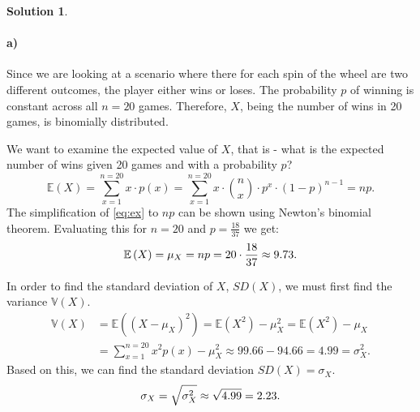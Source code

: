 \documentclass[a4paper]{article}
\theoremstyle{definition}
\newtheorem{sol}{Solution}
\begin{document}
\begin{sol}
\item\paragraph{a)} 
Since we are looking at a scenario where there for each spin of the wheel are
two different outcomes, the player either wins or loses. The probability $p$ of
winning is constant across all $n = 20$ games. Therefore, $X$, being the number
of wins in 20 games, is binomially distributed.

We want to examine the expected value of $X$, that is - what is the expected
number of wins given 20 games and with a probability $p$?
\begin{equation}
  \label{eq:ex}
  \mathbb{E}\left( X \right) = \sum_{x = 1}^{n = 20} x\cdot p(x) = \sum_{x =
  1}^{n = 20} x \cdot {n \choose x} \cdot p^{x} \cdot \left( 1-p \right)^{n-1}
  = np.
\end{equation}
The simplification of \eqref{eq:ex} to $np$ can be shown using Newton's binomial theorem.
Evaluating this for $n = 20$ and $p = \frac{18}{37}$ we get:
\begin{equation}
  \notag
  \mathbb{E}\left( X \right) = \mu_X = np = 20\cdot \frac{18}{37} \approx 9.73.
\end{equation}

In order to find the standard deviation of $X$, $SD(X)$, we must first find the variance $\mathbb{V}(X)$.
\begin{align*}
  \mathbb{V}(X) &= \mathbb{E}\left(\left(X-\mu_X\right)^{2}\right) = \mathbb{E}\left( X^{2} \right) - \mu_X^{2} = \mathbb{E}\left( X^{2} \right) - \mu_{X} \\
  &= \sum_{x=1}^{n=20} x^{2} p(x) - \mu_X^{2} \approx 99.66 - 94.66 = 4.99 = \sigma_{X}^{2}.
\end{align*}
Based on this, we can find the standard deviation $SD(X) = \sigma_{X}$.
\begin{equation}
  \notag
  \sigma_{X} = \sqrt{\sigma_{X}^{2}} \approx \sqrt{4.99} = 2.23.
\end{equation}


\end{sol}
\end{document}
